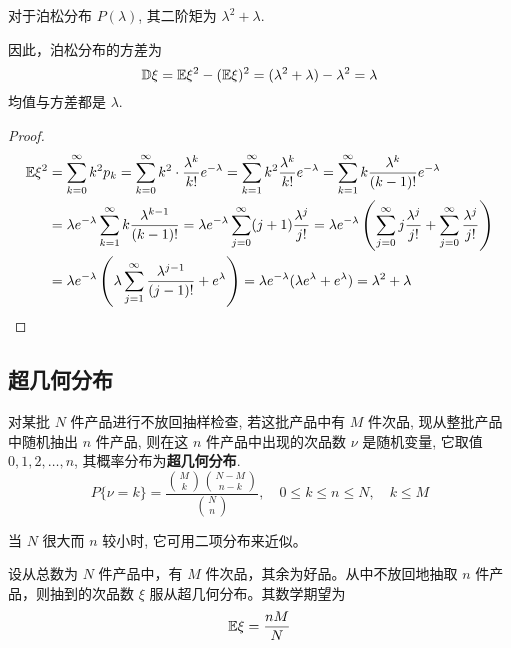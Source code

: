\begin{proposition} \label{prop:poisson_variance}
对于泊松分布 $P(\lambda)$, 其二阶矩为 $\lambda^2 + \lambda$.

因此，泊松分布的方差为
\begin{equation} \label{eq:poisson_variance_formula}
\mathbb{D}\xi = \mathbb{E}\xi^2 - (\mathbb{E}\xi)^2 = (\lambda^2 + \lambda) - \lambda^2 = \lambda
\end{equation}
均值与方差都是 $\lambda$.
\end{proposition}
\begin{proof}
    \begin{align*}
\mathbb{E}\xi^2 &= \sum_{k=0}^\infty k^2 p_k = \sum_{k=0}^\infty k^2 \cdot \frac{\lambda^k}{k!}e^{-\lambda} 
= \sum_{k=1}^\infty k^2 \frac{\lambda^k}{k!}e^{-\lambda}
= \sum_{k=1}^\infty k \frac{\lambda^k}{(k-1)!}e^{-\lambda} \\
&= \lambda e^{-\lambda} \sum_{k=1}^\infty k \frac{\lambda^{k-1}}{(k-1)!} 
= \lambda e^{-\lambda} \sum_{j=0}^\infty (j+1) \frac{\lambda^j}{j!}
= \lambda e^{-\lambda} \left( \sum_{j=0}^\infty j \frac{\lambda^j}{j!} + \sum_{j=0}^\infty \frac{\lambda^j}{j!} \right) \\
&= \lambda e^{-\lambda} \left( \lambda \sum_{j=1}^\infty \frac{\lambda^{j-1}}{(j-1)!} + e^\lambda \right)
= \lambda e^{-\lambda} (\lambda e^\lambda + e^\lambda)
= \lambda^2 + \lambda
\end{align*}
\end{proof}
\subsection{超几何分布}\label{subsec:超几何分布}
\begin{definition}[超几何分布]\label{def:超几何分布}
    对某批 $N$ 件产品进行不放回抽样检查, 若这批产品中有 $M$ 件次品, 现从整批产品中随机抽出 $n$ 件产品, 则在这 $n$ 件产品中出现的次品数 $\nu$ 是随机变量, 它取值 $0,1,2,\ldots,n$, 其概率分布为\textbf{超几何分布}.
\begin{equation} \label{eq:hypergeometric_pmf}
P\{\nu=k\} = \frac{\binom{M}{k}\binom{N-M}{n-k}}{\binom{N}{n}}, \quad 0 \le k \le n \le N, \quad k \le M
\end{equation}
\end{definition}
\begin{remark}
    当 $N$ 很大而 $n$ 较小时, 它可用二项分布来近似。
\end{remark}
\begin{proposition} \label{prop:hypergeometric_expectation}
设从总数为 $N$ 件产品中，有 $M$ 件次品，其余为好品。从中不放回地抽取 $n$ 件产品，则抽到的次品数 $\xi$ 服从超几何分布。其数学期望为
\[
\mathbb{E}\xi = \frac{nM}{N}
\]
\end{proposition}

